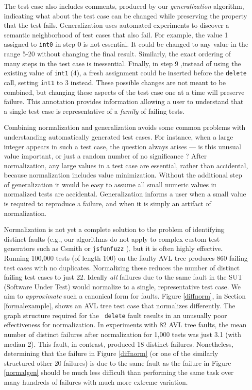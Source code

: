 The test case also includes comments, produced by our
\emph{generalization} \cite{SmartCheck} algorithm, indicating what
about the test case can be changed while preserving the property that
the test fails.  Generalization uses automated experiments to discover
a semantic neighborhood of test cases that also fail.  For example,
the value 1 assigned to {\tt int0} in step 0 is not essential.  It
could be changed to any value in the range 5-20 without changing the
final result.  Similarly, the exact ordering of many steps in the test
case is inessential.  Finally, in step 9 ,instead of using the existing
value of {\tt int1} (4), a fresh assignment could be inserted before
the {\tt delete} call, setting {\tt int1} to 3 instead.  These
possible changes are not meant to be combined, but changing these aspects of the test case one at a time
will preserve failure.  This annotation provides information allowing
a user to understand that a single test case is representative of a
\emph{family} of failing tests.

Combining normalization and generalization avoids some common problems
with understanding automatically generated test cases.  For instance,
when a large integer appears in such a test case, the question always
arises --- is this unusual value important, or just a random number of
no significance \cite{MakeMost}?  After normalization, any large
values in a test case are essential, rather than
accidental, because normalization includes value minimization.
Without the additional step of generalization it would be
easy to assume all small numeric values in normalized
tests are accidental.  Generalization informs a user when a small
value is required to reproduce a failure, and when it is simply an
artifact of normalization.

Normalization is not yet a complete solution to the problem of identifying
distinct faults (e.g., our algorithms do not apply to complex custom
test generators such as Csmith \cite{csmith} or {\tt jsfunfuzz}
\cite{jsfunfuzz}), but it is often highly effective.  Running 100,000
tests (of length 100) on the faulty AVL tree produces 860 failing test
cases with no duplicates.  Normalizing these reduces the number of
distinct failing test cases to just 22.  Ideally \emph{all} failures
due to the same fault in the SUT (Software Under Test) would normalize
to a single, representative test case.  We aim to
\emph{approximate} such a canonical form for faults.  Figure \ref{diffnorm},
in Section \ref{formalexample}, shows an AVL tree test case that
normalizes differently.  The graph structure required for the {\tt
  delete} fault results in an
unusually poor effectiveness for normalization.  In experiments with 82 AVL tree faults,
the mean number of distinct failures after normalization for 1,000
tests was just 3.1 (with median 2). This fault, in contrast, produced 18
distinct failures.  Nonetheless, determining that the failure in Figure
\ref{diffnorm} (or one of the similarly structured other 20 failures)
is due to the same fault as the failure in Figure \ref{normalgen}
should be much less difficult than performing the same task over many hundreds of failures with much more extreme variation. 

